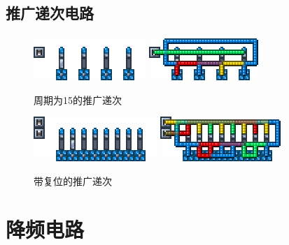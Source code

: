 \subsection{推广递次电路}
\mbox{}
\begin{figure}[!ht]
    \centering
    \includegraphics{images/84.png}
    \qquad
    \includegraphics{images/85.png}
    \caption{周期为15的推广递次}
\end{figure}
\begin{figure}[!ht]
    \centering
    \includegraphics{images/319.png}
    \qquad
    \includegraphics{images/320.png}
    \caption{带复位的推广递次}
\end{figure}

\section{降频电路}
